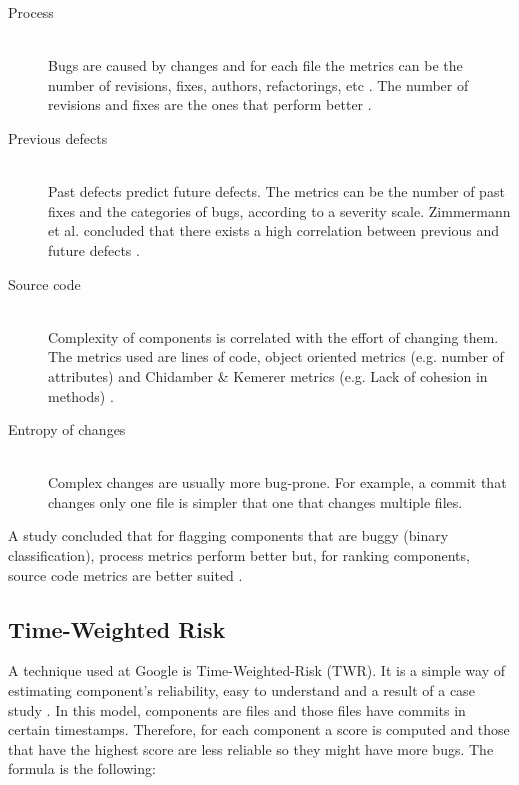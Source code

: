\begin{description}
  \item[Process] \hfill \\ 
  Bugs are caused by changes and for each file the metrics can be the number of revisions, fixes, authors, refactorings, etc \cite{Moser:2008:CAE:1368088.1368114}. The number of revisions and fixes are the ones that perform better \cite{Zimmermann:2007:PDE:1268984.1269057, 859533}.

 \item[Previous defects] \hfill \\
 Past defects predict future defects. The metrics can be the number of past fixes and the categories of bugs, according to a severity scale. Zimmermann et al. concluded that there exists a high correlation between previous and future defects \cite{Zimmermann:2007:PDE:1268984.1269057}.

 \item[Source code] \hfill \\
 Complexity of components is correlated with the effort of changing them. The metrics used are lines of code, object oriented metrics (e.g. number of attributes) and Chidamber \& Kemerer metrics (e.g. Lack of cohesion in methods) \cite{295895}.
 
 \item[Entropy of changes] \hfill \\ 
 Complex changes are usually more bug-prone. For example, a commit that changes only one file is simpler that one that changes multiple files.

\end{description}

A study concluded that for flagging components that are buggy (binary classification), process metrics perform better but, for ranking components, source code metrics are better suited \cite{D'Ambros:2012:EDP:2318097.2318149}.

\subsection{Time-Weighted Risk}
A technique used at Google is Time-Weighted-Risk (TWR). It is a simple way of estimating component's reliability, easy to understand and a result of a case study \cite{Chris2013}. In this model, components are files and those files have commits in certain timestamps. Therefore, for each component a score is computed and those that have the highest score are less reliable so they might have more bugs. The formula is the following:

